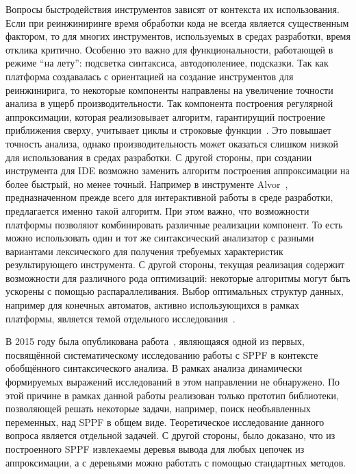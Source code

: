 Вопросы быстродействия инструментов зависят от контекста их использования. Если при реинжиниринге время обработки кода не всегда является существенным фактором, то для многих инструментов, используемых  в средах разработки, время отклика критично.  Особенно это важно для функциональности, работающей в режиме ``на лету'': подсветка синтаксиса, автодополениее, подсказки. Так как платформа создавалась с ориентацией на создание инструментов для реинжинирига, то некоторые компоненты направлены на увеличение точности анализа в ущерб производительности. Так компонента построения регулярной аппроксимации, которая реализовывает алгоритм, гарантирущий построение приближения сверху, учитывает циклы и строковые функции~\cite{RegOverApprox}. Это повышает точность анализа, однако производительность может оказаться слишком низкой для использования в средах разработки. С другой стороны, при создании инструмента для IDE возможно заменить алгоритм построения аппроксимации на более быстрый, но менее точный. Например в инструменте Alvor~\cite{Alvor2}, предназначенном прежде всего для интерактивной работы в среде разработки, предлагается именно такой алгоритм.  При этом важно, что возможности платформы позволяют комбинировать различные реализации компонент. То есть можно использовать один и тот же синтаксический анализатор с разными вариантами лексического для получения требуемых характеристик результирующего инструмента. С другой стороны, текущая реализация содержит возможности для различного рода оптимизаций: некоторые алгоритмы могут быть ускорены с помощью распараллеливания. Выбор оптимальных структур данных, например для конечных автоматов, активно использующихся в рамках платформы, является темой отдельного исследования~\cite{DataStructureForFA}.

В 2015 году была опубликована работа~\cite{SPPF2015}, являющаяся одной из первых, посвящённой систематическому исследованию работы с SPPF в контексте обобщённого синтаксического анализа. В рамках  анализа динамически формируемых выражений исследований в этом направлении не обнаружено. По этой причине в рамках данной работы реализован только прототип библиотеки, позволяющей решать некоторые задачи, например, поиск необъявленных переменных, над SPPF в общем виде. Теоретическое исследование данного вопроса является отдельной задачей. С другой стороны, было доказано, что из построенного SPPF извлекаемы деревья вывода для любых цепочек из аппроксимации, а с деревьями можно работать с помощью стандартных методов. 

\clearpage

